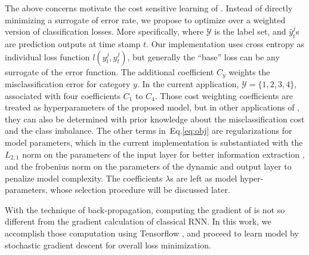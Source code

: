 The above concerns motivate the cost sensitive learning of \modelname.
Instead of directly minimizing a surrogate of error rate, we propose to optimize over a weighted version of classification losses.
More specifically, 
where $\mathcal{Y}$ is the label set, and $\hat{y}_t^j$s are prediction outputs at time stamp $t$.
Our implementation uses cross entropy as individual loss function $l(y_t^j,\hat{y}_t^j)$, but generally the ``base'' loss can be any surrogate of the error function.
The additional coefficient $C_{y}$ weights the misclassification error for category $y$.
In the current application, $\mathcal{Y} = \{1,2,3,4\}$, associated with four coefficients $C_1$ to $C_4$.
Those cost weighting coefficients are treated as hyperparameters of the proposed model, but in other applications of \modelname, they can also be determined with prior knowledge about the misclassification cost and the class imbalance. The other terms in~Eq.\ref{eq:obj} are regularizations for model parameters, which in the current implementation is substantiated with the $L_{2,1}$ norm on the parameters of the input layer for better information extraction \cite{nie2010efficient}, and the frobenius norm on the parameters of the dynamic and output layer to penalize model complexity. The coefficients $\lambda$s are left as model hyper-parameters, whose selection procedure will be discussed later.

With the technique of back-propagation, computing the gradient of \modelname is not so different from the gradient calculation of classical RNN.
In this work, we accomplish those computation using Tensorflow \cite{bib:Tensorflow}, and proceed to learn \modelname model by stochastic gradient descent for overall loss minimization.


